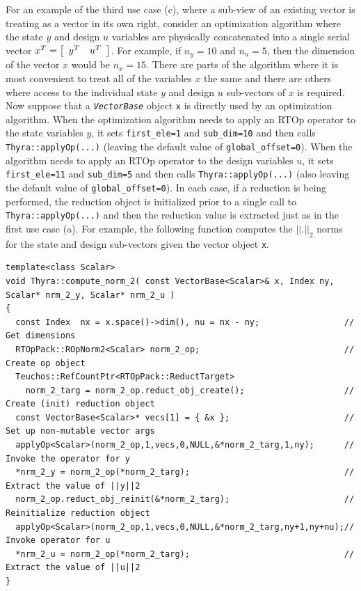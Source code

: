 \documentclass[pdf,ps2pdf,11pt]{SANDreport}
\begin{document}
For an example of the third use case (c), where a sub-view of an
existing vector is treating as a vector in its own right, consider an
optimization algorithm where the state $y$ and design $u$ variables
are physically concatenated into a single serial vector $x^T =
{\bmat{cc} y^T & u^T \emat}$.  For example, if $n_y = 10$ and $n_u =
5$, then the dimension of the vector $x$ would be $n_x = 15$.  There
are parts of the algorithm where it is most convenient to treat all of
the variables $x$ the same and there are others where access to the
individual state $y$ and design $u$ sub-vectors of $x$ is required.
Now suppose that a {}\texttt{\textit{Vector\-Base}} object {}\texttt{x} is
directly used by an optimization algorithm.  When the optimization
algorithm needs to apply an RTOp operator to the state variables $y$,
it sets {}\texttt{first\_ele=1} and {}\texttt{sub\_dim=10} and then
calls {}\texttt{Thyra::applyOp(\-...)} (leaving the default value of
{}\texttt{global\_offset=0}).  When the algorithm needs to apply an
RTOp operator to the design variables $u$, it sets
{}\texttt{first\_ele=11} and {}\texttt{sub\_dim=5} and then calls
{}\texttt{Thyra::applyOp(\-...)} (also leaving the default value of
{}\texttt{global\_offset=0}).  In each case, if a reduction is being
performed, the reduction object is initialized prior to a single call
to {}\texttt{Thyra::applyOp(\-...)} and then the reduction value is
extracted just as in the first use case (a).  For example, the
following function computes the $||.||_2$ norms for the state and
design sub-vectors given the vector object {}\texttt{x}.

{\scriptsize\begin{verbatim}
template<class Scalar>
void Thyra::compute_norm_2( const VectorBase<Scalar>& x, Index ny, Scalar* nrm_2_y, Scalar* nrm_2_u )
{
  const Index  nx = x.space()->dim(), nu = nx - ny;                 // Get dimensions
  RTOpPack::ROpNorm2<Scalar> norm_2_op;                             // Create op object
  Teuchos::RefCountPtr<RTOpPack::ReductTarget>
    norm_2_targ = norm_2_op.reduct_obj_create();                    // Create (init) reduction object
  const VectorBase<Scalar>* vecs[1] = { &x };                       // Set up non-mutable vector args
  applyOp<Scalar>(norm_2_op,1,vecs,0,NULL,&*norm_2_targ,1,ny);      // Invoke the operator for y
  *nrm_2_y = norm_2_op(*norm_2_targ);                               // Extract the value of ||y||2
  norm_2_op.reduct_obj_reinit(&*norm_2_targ);                       // Reinitialize reduction object
  applyOp<Scalar>(norm_2_op,1,vecs,0,NULL,&*norm_2_targ,ny+1,ny+nu);// Invoke operator for u
  *nrm_2_u = norm_2_op(*norm_2_targ);                               // Extract the value of ||u||2
}
\end{verbatim}}
\end{document}
